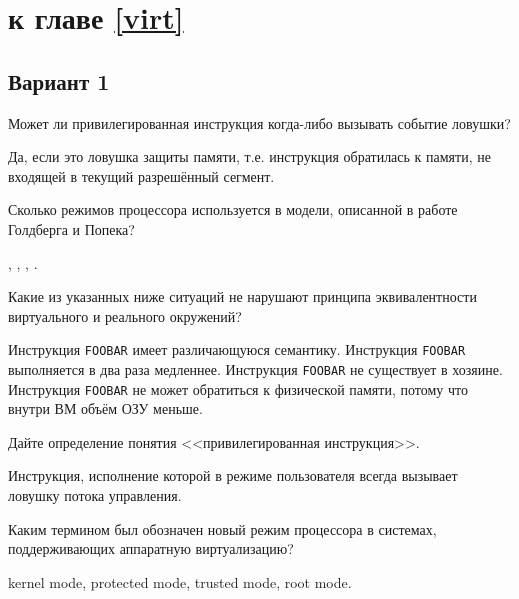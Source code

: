 \section{\Questions к главе \ref{virt}} %

\subsection*{Вариант 1}

\begin{questions}
\question[3] Может ли привилегированная инструкция когда-либо вызывать событие ловушки?
\begin{solution}[1cm]
Да, если это ловушка защиты памяти, т.е. инструкция обратилась к памяти, не входящей в текущий разрешённый сегмент.
\end{solution}

\question[1] Сколько режимов процессора используется в модели, описанной в работе Голдберга и Попека?
\begin{choices}
    ,
    ,
    ,
    .
\end{choices}

\question[3] Какие из указанных ниже ситуаций не нарушают принципа эквивалентности виртуального и реального окружений?
\begin{choices}
    \choice Инструкция \texttt{FOOBAR} имеет различающуюся семантику.
    \correctchoice Инструкция \texttt{FOOBAR} выполняется в два раза медленнее.
    \choice Инструкция \texttt{FOOBAR} не существует в хозяине.
    \correctchoice Инструкция \texttt{FOOBAR} не может обратиться к физической памяти, потому что внутри ВМ объём ОЗУ меньше.
\end{choices}

\question[3] Дайте определение понятия <<привилегированная инструкция>>.
\begin{solution}[1cm]
Инструкция, исполнение которой в режиме пользователя всегда вызывает ловушку потока управления.
\end{solution}

\question[3] Каким термином был обозначен новый режим процессора в системах, поддерживающих аппаратную виртуализацию?
\begin{choices}
    \choice kernel mode,
    \choice protected mode,
    \choice trusted mode,
    \correctchoice root mode.
\end{choices}

\end{questions}

